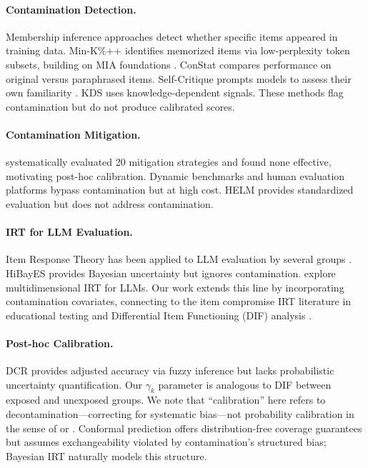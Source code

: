 \documentclass[11pt,a4paper]{article}
\begin{document}
\paragraph{Contamination Detection.}
Membership inference approaches detect whether specific items appeared in training data.
Min-K\%++ \citep{shi2024detecting} identifies memorized items via low-perplexity token subsets, building on MIA foundations \citep{shokri2017membership,carlini2022quantifying}.
ConStat \citep{dekoninck2024constat} compares performance on original versus paraphrased items.
Self-Critique prompts models to assess their own familiarity \citep{weller2024selfcritique}.
KDS \citep{dong2024generalization} uses knowledge-dependent signals.
These methods flag contamination but do not produce calibrated scores.

\paragraph{Contamination Mitigation.}
\citet{oren2024proving} systematically evaluated 20 mitigation strategies and found none effective, motivating post-hoc calibration.
Dynamic benchmarks \citep{white2024livebench} and human evaluation platforms \citep{zheng2023judging} bypass contamination but at high cost.
HELM \citep{liang2023holistic} provides standardized evaluation but does not address contamination.

\paragraph{IRT for LLM Evaluation.}
Item Response Theory has been applied to LLM evaluation by several groups \citep{lalor2024benchmarking,polo2024tinybenchmarks}.
HiBayES provides Bayesian uncertainty but ignores contamination.
\citet{burnell2023rethink} explore multidimensional IRT for LLMs.
Our work extends this line by incorporating contamination covariates, connecting to the item compromise IRT literature in educational testing \citep{eckerly2017detecting,sinharay2017assessment} and Differential Item Functioning (DIF) analysis \citep{holland1993differential,thissen1993detection,zumbo1999handbook}.

\paragraph{Post-hoc Calibration.}
DCR \citep{yang2025dcr} provides adjusted accuracy via fuzzy inference but lacks probabilistic uncertainty quantification.
Our $\gamma_k$ parameter is analogous to DIF between exposed and unexposed groups.
We note that ``calibration'' here refers to decontamination---correcting for systematic bias---not probability calibration in the sense of \citet{guo2017calibration} or \citet{platt1999probabilistic}.
Conformal prediction \citep{angelopoulos2023conformal} offers distribution-free coverage guarantees but assumes exchangeability violated by contamination's structured bias; Bayesian IRT naturally models this structure.
\end{document}
